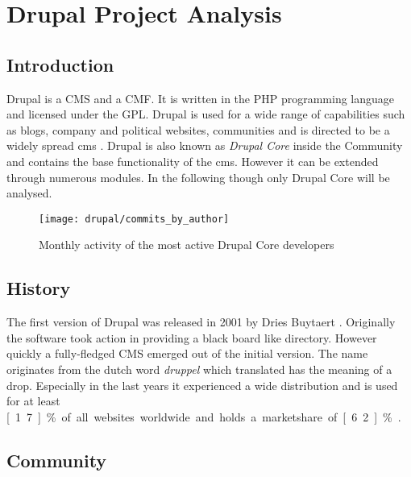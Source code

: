 \section{Drupal Project Analysis} %
\label{sec:Drupal Project Analysis}


\subsection{Introduction} %
\label{sub:Introduction}

Drupal is a \ac{CMS} and a \ac{CMF}. It is written in the PHP programming
language and licensed under the \ac{GPL}. Drupal is used for a wide range
of capabilities such as blogs, company and political websites, communities and
is directed to be a widely spread cms \cite{DrupalOverview}. Drupal is also
known as \emph{Drupal Core} inside the Community and contains the base
functionality of the cms. However it can be extended through numerous modules.
In the following though only Drupal Core will be analysed.

\begin{figure}[htbp]
  \centering
  \texttt{[image: drupal/commits\_by\_author]}
  \caption{Monthly activity of the most active Drupal Core developers}
\end{figure}


\subsection{History} %
\label{sub:History}

The first version of Drupal was released in 2001 by Dries Buytaert
\cite{DrupalHistory}. Originally the software took action in providing a black
board like directory. However quickly a fully-fledged \ac{CMS} emerged out of
the initial version. The name originates from the dutch word \emph{druppel}
which translated has the meaning of a drop. Especially in the last years it
experienced a wide distribution and is used for at least \unit[1.7]{\%} of all
websites worldwide and holds a marketshare of \unit[6.2]{\%}
\cite{DrupalBuiltWith,DrupalW3Techs}.


\subsection{Community} %
\label{sub:Community}

